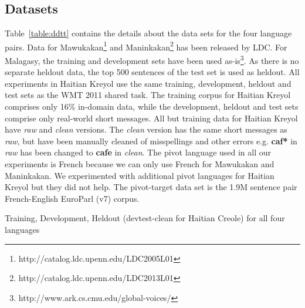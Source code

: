 \documentclass[11pt]{article}
\begin{document}
\subsection{Datasets} Table~\ref{table:ddtt} contains the details about the data sets for the four language pairs. Data for Mawukakan\footnote{http://catalog.ldc.upenn.edu/LDC2005L01} and Maninkakan\footnote{http://catalog.ldc.upenn.edu/LDC2013L01} has been released by LDC. For Malagasy, the training and development sets have been used as-is\footnote{http://www.ark.cs.cmu.edu/global-voices/}. As there is no separate heldout data, the top 500 sentences of the test set is used as heldout. All experiments in Haitian Kreyol use the same training, development, heldout and test sets as the WMT 2011 shared task. The training corpus for Haitian Kreyol comprises only 16\% in-domain data, while the development, heldout and test sets comprise only real-world short messages. All but training data for Haitian Kreyol have \emph{raw} and \emph{clean} versions. The \emph{clean} version has the same short messages as \emph{raw}, but have been manually cleaned of misspellings and other errors e.g. \textbf{caf*} in \emph{raw} has been changed to \textbf{cafe} in \emph{clean}. The pivot language used in all our experiments is French because we can only use French for Mawukakan and Maninkakan. We experimented with additional pivot languages for Haitian Kreyol but they did not help. The pivot-target data set is the 1.9M sentence pair French-English EuroParl (v7) corpus.
	\begin{table}
		\small
		\centering
		
		\caption{Training, Development, Heldout (devtest-clean for Haitian Creole) for all four languages}
		\label{table:ddtt}
	\end{table}
\end{document}
